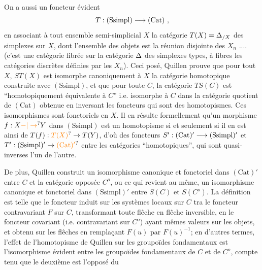 
On a aussi un foncteur évident
\[
T:(\mathrm{Ssimpl})\handwritten{\longrightarrow}(\mathrm{Cat})\ ,
\]
en associant à tout ensemble semi-simplicial $X$ la catégorie $T(X)=\Delta_{/X}$ des simplexes sur $X$, dont l'ensemble des objets est la réunion disjointe des $X_n$ .... (c'est une catégorie fibrée sur la catégorie $\Delta$ des simplexes types, à fibres les catégories discrètes définies par les $X_n$). Ceci posé, Quillen prouve que pour tout $X$, $ST(X)$ est isomorphe canoniquement à $X$  la catégorie homotopique construite avec $(\mathrm{Ssimpl})$, et que pour toute $C$, la catégorie $TS(C)$ est  ``homotopiquement équivalente à $C$''  i.e.  isomorphe à $C$ dans la catégorie quotient de $(\mathrm{Cat})$ obtenue en inversant les foncteurs qui sont des homotopismes.  Ces isomorphismes sont fonctoriels en $X$. Il en résulte formellement qu'un morphisme $f:X\handwritten{\unsure{-|\to}}Y$ dans $(\mathrm{Ssimpl})$ est un homotopisme si et seulement si il en est ainsi de $T(f):\unsure{T(X)}\handwritten{\to}T(Y)$, d'où des foncteurs $S':(\mathrm{Cat})'\longrightarrow(\mathrm{Ssimpl})'$ et $T':(\mathrm{Ssimpl})'\handwritten{\to}\unsure{(\mathrm{Cat})'}$ entre les catégories ``homotopiques'',  qui sont quasi-inverses l'un de l'autre.

De plus, Quillen construit un isomorphisme canonique et fonctoriel dans $(\mathrm{Cat})'$ entre $C$ et la catégorie opposée $C^o$, ou ce qui revient au même, un isomorphisme canonique et fonctoriel dans $(\mathrm{Ssimpl})'$ entre $S(C)$ et $S(C^o)$.  La définition est telle que le foncteur induit sur les systèmes locaux sur $C$ tra le foncteur contravariant $F$ sur $C$, transformant toute flêche en flêche inversible, en le foncteur covariant (i.e. contravariant sur $C^o$) ayant mêmes valeurs sur les objets, et obtenu sur les flêches en remplaçant $F(u)$ par $F(u)^{-1}$; en d'autres termes, l'effet de l'homotopisme de Quillen sur les groupoïdes fondamentaux est l'isomorphisme évident entre les groupoïdes fondamentaux de $C$ et de $C^o$,  compte tenu que le deuxième est l'opposé du


